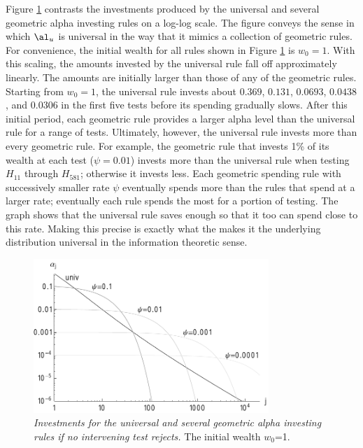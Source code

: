 \documentclass[12pt]{article}
\begin{document}
 
 Figure \ref{fig:rules} contrasts the investments produced by the universal and
 several geometric alpha investing rules on a log-log scale.  The figure conveys
 the sense in which $\al_u$ is universal in the way that it mimics a collection
 of geometric rules.  For convenience, the initial wealth for all rules shown in
 Figure \ref{fig:rules} is $w_0 = 1$.  With this scaling, the amounts invested
 by the universal rule fall off approximately linearly.  The amounts are
 initially larger than those of any of the geometric rules.  Starting from
 $w_0=1$, the universal rule invests about $0.369$, $0.131$, $0.0693$, $0.0438$,
 and $0.0306$ in the first five tests before its spending gradually slows.
  After this initial period, each geometric rule provides a larger alpha level
 than the universal rule for a range of tests.  Ultimately, however, the
 universal rule invests more than every geometric rule.  For example, the
 geometric rule that invests 1\% of its wealth at each test ($\psi=0.01$)
 invests more than the universal rule when testing $H_{11}$ through $H_{581}$;
 otherwise it invests less.  Each geometric spending rule with successively
 smaller rate $\psi$ eventually spends more than the rules that spend at a
 larger rate; eventually each rule spends the most for a portion of testing.
  The graph shows that the universal rule saves enough so that it too can spend
 close to this rate.  Making this precise is exactly what the makes it the
 underlying distribution universal in the information theoretic sense.



 \begin{figure}
 \caption{ \label{fig:rules} { \sl Investments for the universal and several
 geometric alpha investing rules if no intervening test rejects. } The initial
 wealth $w_0$=1. }

 \centerline{
 \vspace{0.1in}
 \includegraphics[width=3.5in]{figures/rules} }
 \vspace{0.2in}
 \end{figure}
\end{document}
